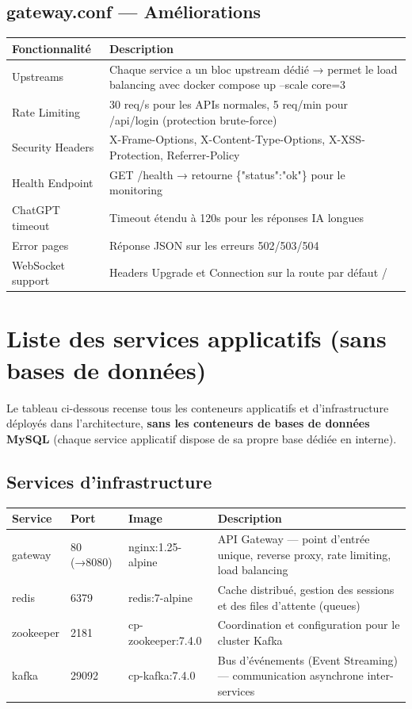 \documentclass{article}
\begin{document}
\subsection{gateway.conf — Améliorations}

\begin{longtable}{p{4cm}p{11cm}}
\toprule
\textbf{Fonctionnalité} & \textbf{Description} \\
\midrule
Upstreams & Chaque service a un bloc upstream dédié → permet le load balancing avec docker compose up --scale core=3 \\
Rate Limiting & 30 req/s pour les APIs normales, 5 req/min pour /api/login (protection brute-force) \\
Security Headers & X-Frame-Options, X-Content-Type-Options, X-XSS-Protection, Referrer-Policy \\
Health Endpoint & GET /health → retourne \{"status":"ok"\} pour le monitoring \\
ChatGPT timeout & Timeout étendu à 120s pour les réponses IA longues \\
Error pages & Réponse JSON sur les erreurs 502/503/504 \\
WebSocket support & Headers Upgrade et Connection sur la route par défaut / \\
\bottomrule
\end{longtable}

\section{Liste des services applicatifs (sans bases de données)}

Le tableau ci-dessous recense tous les conteneurs applicatifs et d'infrastructure déployés dans l'architecture, \textbf{sans les conteneurs de bases de données MySQL} (chaque service applicatif dispose de sa propre base dédiée en interne).

\subsection{Services d'infrastructure}

\begin{longtable}{p{3.5cm}p{2cm}p{3cm}p{6cm}}
\toprule
\textbf{Service} & \textbf{Port} & \textbf{Image} & \textbf{Description} \\
\midrule
gateway & 80 (→8080) & nginx:1.25-alpine & API Gateway — point d'entrée unique, reverse proxy, rate limiting, load balancing \\
redis & 6379 & redis:7-alpine & Cache distribué, gestion des sessions et des files d'attente (queues) \\
zookeeper & 2181 & cp-zookeeper:7.4.0 & Coordination et configuration pour le cluster Kafka \\
kafka & 29092 & cp-kafka:7.4.0 & Bus d'événements (Event Streaming) — communication asynchrone inter-services \\
\bottomrule
\end{longtable}
\end{document}
